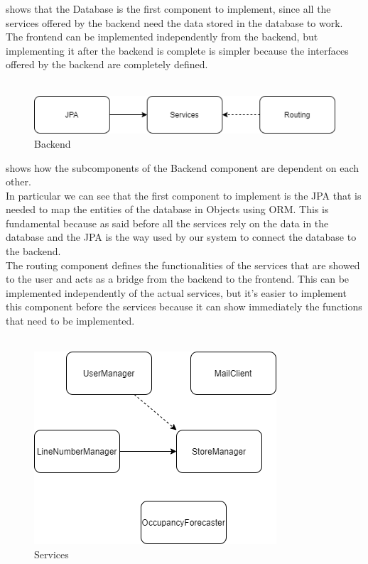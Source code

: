  shows that the Database is the first component to implement, since all the services offered by the backend
need the data stored in the database to work. \\
The frontend can be implemented independently from the backend, but implementing it after the backend is complete is simpler because the interfaces
offered by the backend are completely defined.\\
\\
\begin{figure}[H]
    \centering
    \includegraphics{Images/IntegrationAndTestingPlan/Backend.png}
    \caption{Backend}
    \label{fig:Backend}
\end{figure}
 shows how the subcomponents of the Backend component are dependent on each other. \\
In particular we can see that the first component to implement is the JPA that is needed to map the entities of the database in Objects
using ORM. This is fundamental because as said before all the services rely on the data in the database and the JPA is
the way used by our system to connect the database to the backend.\\
The routing component defines the functionalities of the services that are showed to the user and acts as a bridge from the backend
to the frontend.
This can be implemented independently of the actual services, but it's easier to implement this component before the services because
it can show immediately the functions that need to be implemented.\\
\\
\begin{figure}[H]
    \centering
    \includegraphics[height=0.4\textwidth]{Images/IntegrationAndTestingPlan/Services.png}
    \caption{Services}
    \label{fig:Services}
\end{figure}

